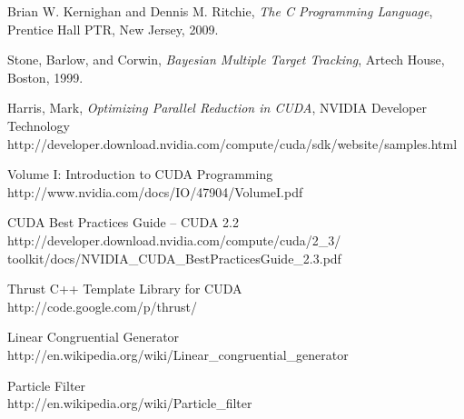 \documentclass{article}
\begin{document}
\begin{thebibliography}{9}

  Brian W. Kernighan and Dennis M. Ritchie,
  \emph{The C Programming Language},
  Prentice Hall PTR, New Jersey,
  2009.

  Stone, Barlow, and Corwin,
  \emph{Bayesian Multiple Target Tracking},
  Artech House, Boston,
  1999.

   Harris, Mark,
   \emph{Optimizing Parallel Reduction in CUDA},
   NVIDIA Developer Technology \\
   http://developer.download.nvidia.com/compute/cuda/sdk/website/samples.html

   Volume I: Introduction to CUDA Programming \\
   http://www.nvidia.com/docs/IO/47904/VolumeI.pdf

   CUDA Best Practices Guide -- CUDA 2.2\\
   http://developer.download.nvidia.com/compute/cuda/2\_3/\\
   toolkit/docs/NVIDIA\_CUDA\_BestPracticesGuide\_2.3.pdf

   Thrust C++ Template Library for CUDA \\
   http://code.google.com/p/thrust/

   Linear Congruential Generator \\
   http://en.wikipedia.org/wiki/Linear\_congruential\_generator

   Particle Filter \\
   http://en.wikipedia.org/wiki/Particle\_filter

\end{thebibliography}
\end{document}

